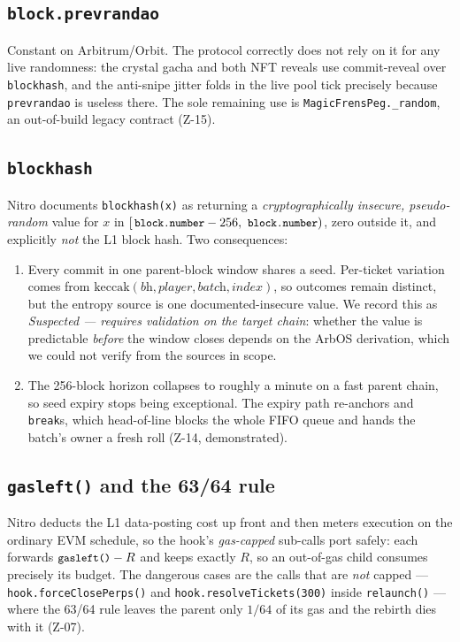 \documentclass[10pt,a4paper]{article}
\newcommand{\code}[1]{\texttt{\small #1}}
\begin{document}
\subsection{\code{block.prevrandao}}
Constant on Arbitrum/Orbit. The protocol correctly does not rely on it for any live
randomness: the crystal gacha and both NFT reveals use commit-reveal over
\code{blockhash}, and the anti-snipe jitter folds in the live pool tick precisely because
\code{prevrandao} is useless there. The sole remaining use is
\code{MagicFrensPeg.\_random}, an out-of-build legacy contract (Z-15).

\subsection{\code{blockhash}}
Nitro documents \code{blockhash(x)} as returning a \emph{cryptographically insecure,
pseudo-random} value for $x$ in $[\,\code{block.number}-256,\ \code{block.number})$, zero
outside it, and explicitly \emph{not} the L1 block hash. Two consequences:

\begin{enumerate}[leftmargin=1.5em]
\item Every commit in one parent-block window shares a seed. Per-ticket variation comes
from $\mathrm{keccak}(\textit{bh}, \textit{player}, \textit{batch}, \textit{index})$, so
outcomes remain distinct, but the entropy source is one documented-insecure value.
We record this as \emph{Suspected --- requires validation on the target chain}: whether
the value is predictable \emph{before} the window closes depends on the ArbOS derivation,
which we could not verify from the sources in scope.
\item The 256-block horizon collapses to roughly a minute on a fast parent chain, so seed
expiry stops being exceptional. The expiry path re-anchors and \code{break}s, which
head-of-line blocks the whole FIFO queue and hands the batch's owner a fresh roll
(Z-14, demonstrated).
\end{enumerate}

\subsection{\code{gasleft()} and the 63/64 rule}
Nitro deducts the L1 data-posting cost up front and then meters execution on the ordinary
EVM schedule, so the hook's \emph{gas-capped} sub-calls port safely: each forwards
$\code{gasleft()}-R$ and keeps exactly $R$, so an out-of-gas child consumes precisely its
budget. The dangerous cases are the calls that are \emph{not} capped ---
\code{hook.forceClosePerps()} and \code{hook.resolveTickets(300)} inside
\code{relaunch()} --- where the 63/64 rule leaves the parent only $1/64$ of its gas and the
rebirth dies with it (Z-07).
\end{document}
